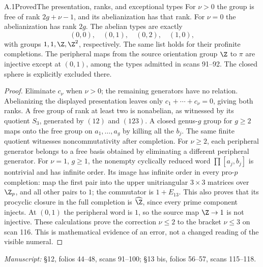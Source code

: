 \begin{claim}{A.1}{Proved}{The presentation, ranks, and exceptional types}
For $\nu>0$ the group is free of rank $2g+\nu-1$, and its abelianization has that rank. For $\nu=0$ the abelianization has rank $2g$. The abelian types are exactly
\[
 (0,0),\quad(0,1),\quad(0,2),\quad(1,0),
\]
with groups $1,1,\Z,\Z^2$, respectively. The same list holds for their profinite completions. The peripheral maps from the source orientation group $\Z$ to $\pi$ are injective except at $(0,1)$, among the types admitted in scans 91--92. The closed sphere is explicitly excluded there.
\end{claim}
\begin{proof}
Eliminate $c_\nu$ when $\nu>0$; the remaining generators have no relation. Abelianizing the displayed presentation leaves only $c_1+\cdots+c_\nu=0$, giving both ranks. A free group of rank at least two is nonabelian, as witnessed by its quotient $S_3$, generated by $(12)$ and $(123)$. A closed genus-$g$ group for $g\ge2$ maps onto the free group on $a_1,\ldots,a_g$ by killing all the $b_j$. The same finite quotient witnesses noncommutativity after completion. For $\nu\ge2$, each peripheral generator belongs to a free basis obtained by eliminating a different peripheral generator. For $\nu=1$, $g\ge1$, the nonempty cyclically reduced word $\prod[a_j,b_j]$ is nontrivial and has infinite order. Its image has infinite order in every pro-$p$ completion: map the first pair into the upper unitriangular $3\times3$ matrices over $\Z_p$, and all other pairs to $1$; the commutator is $1+E_{13}$. This also proves that its procyclic closure in the full completion is $\widehat\Z$, since every prime component injects. At $(0,1)$ the peripheral word is $1$, so the source map $\Z\to1$ is not injective. These calculations prove the correction $\nu\le2$ to the bracket $\nu\le3$ on scan 116. This is mathematical evidence of an error, not a changed reading of the visible numeral.
\end{proof}
\noindent\emph{Manuscript:} \S12, folios 44--48, scans 91--100; \S13 bis, folios 56--57, scans 115--118.

